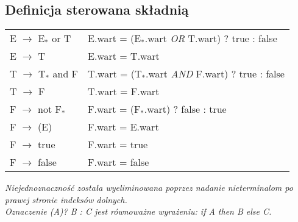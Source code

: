 \documentclass[10pt,a4paper]{article}
\begin{document}
\subsection{Definicja sterowana składnią}
{\renewcommand{\arraystretch}{1.25}%
	\begin{adjustbox}{center}
		\begin{tabular}{ll}
			E $\rightarrow$ E$_{*}$ or T & E.wart = (E$_{*}$.wart \textit{OR} T.wart) ? true : false \\
			E $\rightarrow$ T & E.wart = T.wart \\
			T $\rightarrow$ T$_{*}$ and F & T.wart = (T$_{*}$.wart \textit{AND} F.wart) ? true : false \\
			T $\rightarrow$ F & T.wart = F.wart \\
			F $\rightarrow$ not F$_{*}$ & F.wart = (F$_{*}$.wart) ? false : true \\
			F $\rightarrow$ (E) & F.wart = E.wart \\
			F $\rightarrow$ true & F.wart = true \\
			F $\rightarrow$ false & F.wart = false\\
		\end{tabular}
	\end{adjustbox}
} \quad

\textit{Niejednoznaczność została wyeliminowana poprzez nadanie nieterminalom po prawej stronie indeksów dolnych.}\\

\textit{Oznaczenie (A)? B : C jest równoważne wyrażeniu: if A then B else C.}
\end{document}
